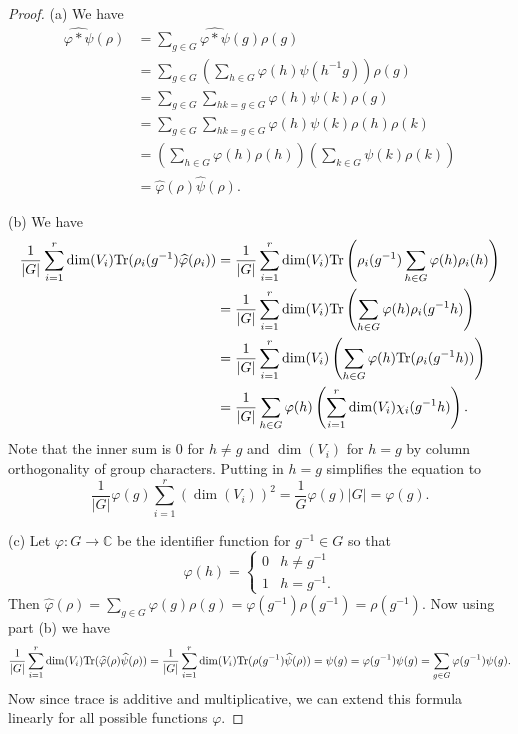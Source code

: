 \documentclass{article}
\newcommand{\tr}{\textup{Tr}}
\begin{document}
\begin{proof}
(a) We have
\begin{align*}
\widehat{\varphi * \psi}(\rho)
&= \sum_{g \in G} \widehat{\varphi * \psi}(g) \rho(g)\\
&= \sum_{g \in G} \left ( \sum_{h \in G} \varphi(h) \psi(h^{-1}g) \right ) \rho(g)\\
&= \sum_{g \in G} \sum_{hk = g \in G} \varphi(h) \psi(k) \rho(g)\\
&= \sum_{g \in G} \sum_{hk = g \in G} \varphi(h) \psi(k) \rho(h) \rho(k)\\
&= \left ( \sum_{h \in G} \varphi(h) \rho(h) \right ) \left ( \sum_{k \in G} \psi(k) \rho(k) \right )\\
&= \widehat{\varphi}(\rho) \widehat{\psi}(\rho).
\end{align*}

(b) We have
\begin{align*}
\frac{1}{|G|} \sum_{i=1}^r \dim(V_i) \tr (\rho_i(g^{-1}) \widehat{\varphi}(\rho_i) )
&= \frac{1}{|G|} \sum_{i=1}^r \dim(V_i) \tr \left (\rho_i(g^{-1}) \sum_{h \in G} \varphi(h) \rho_i(h) \right )\\
&= \frac{1}{|G|} \sum_{i=1}^r \dim(V_i) \tr \left (\sum_{h \in G} \varphi(h) \rho_i(g^{-1}h) \right )\\
&= \frac{1}{|G|} \sum_{i=1}^r \dim(V_i) \left ( \sum_{h \in G} \varphi(h) \tr (\rho_i(g^{-1}h)) \right )\\
&= \frac{1}{|G|} \sum_{h \in G} \varphi(h) \left ( \sum_{i=1}^r \dim(V_i) \chi_i(g^{-1}h) \right ).
\end{align*}
Note that the inner sum is $0$ for $h \neq g$ and $\dim(V_i)$ for $h = g$ by column orthogonality of group characters. Putting in $h = g$ simplifies the equation to
\[
\frac{1}{|G|} \varphi(g) \sum_{i=1}^r (\dim(V_i))^2 = \frac{1}{G} \varphi(g) |G| = \varphi(g).
\]

(c) Let $\varphi : G \to \mathbb{C}$ be the identifier function for $g^{-1} \in G$ so that
\[
\varphi(h) =
\begin{cases}
0 & h \neq g^{-1}\\
1 & h = g^{-1}.
\end{cases}
\]
Then $\widehat{\varphi}(\rho) = \sum_{g \in G} \varphi(g) \rho(g) = \varphi(g^{-1}) \rho(g^{-1}) = \rho(g^{-1})$. Now using part (b) we have
\[
\frac{1}{|G|} \sum_{i=1}^r \dim(V_i) \tr(\widehat{\varphi}(\rho) \widehat{\psi}(\rho)) = \frac{1}{|G|} \sum_{i=1}^r \dim(V_i) \tr(\rho(g^{-1}) \widehat{\psi}(\rho)) = \psi(g) = \varphi(g^{-1})\psi(g) = \sum_{g \in G} \varphi(g^{-1}) \psi(g).
\]
Now since trace is additive and multiplicative, we can extend this formula linearly for all possible functions $\varphi$.
\end{proof}
\end{document}
